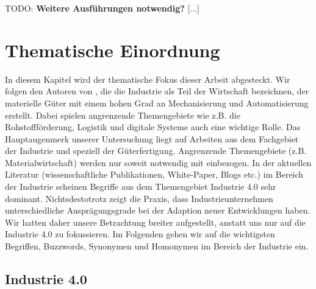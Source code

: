 \documentclass{article}
\begin{document}
TODO: \textbf{Weitere Ausführungen notwendig?} [...]

\section{Thematische Einordnung}

In diesem Kapitel wird der thematische Fokus dieser Arbeit abgesteckt.
Wir folgen den Autoren von \cite{lasi2014industrie}, die die Industrie als Teil der Wirtschaft bezeichnen, der materielle Güter mit einem hohen Grad an Mechanisierung und Automatisierung erstellt.
Dabei spielen angrenzende Themengebiete wie z.B. die Rohstoffförderung, Logistik und digitale Systeme auch eine wichtige Rolle.
Das Hauptaugenmerk unserer Untersuchung liegt auf Arbeiten aus dem Fachgebiet der Industrie und speziell der Güterfertigung.
Angrenzende Themengebiete (z.B. Materialwirtschaft) werden nur soweit notwendig mit einbezogen.
In der aktuellen Literatur (wissenschaftliche Publikationen, White-Paper, Blogs etc.) im Bereich der Industrie scheinen Begriffe aus dem Themengebiet Industrie 4.0 sehr dominant.
Nichtsdestotrotz zeigt die Praxis, dass Industrieunternehmen unterschiedliche Ausprägungsgrade bei der Adaption neuer Entwicklungen haben.
Wir hatten daher unsere Betrachtung breiter aufgestellt, anstatt uns nur auf die Industrie 4.0 zu fokussieren.
Im Folgenden gehen wir auf die wichtigsten Begriffen, Buzzwords, Synonymen und Homonymen im Bereich der Industrie ein.

\subsection{Industrie 4.0}
\end{document}
